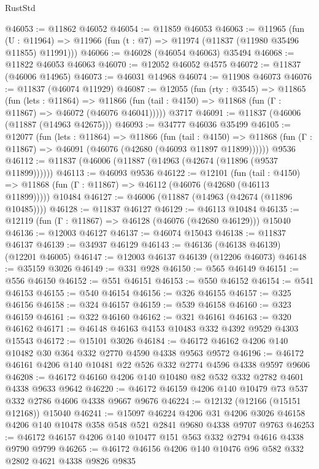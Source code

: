 \begin{lexlean}{RustStd}
\begin{coremodule}
{\begin{coremodule}
{{{{{{{{{{{{{{{{{{{{{{{{{{{{{{{{{{{{{{{{{{{{{{{{{{@46053 := @11862 @46052
@46054 := @11859 @46053
@46063 := @11965
    (fun (U : @11964) => @11966 (fun (t : @7) => @11974 (@11837 (@11980 @35496 @11855) @11991)))
@46066 := @46028 (@46054 @46063) @35494
@46068 := @11822 @46053 @46063
@46070 := @12052 @46052 @4575
@46072 := @11837 (@46006 @14965)
@46073 := @46031 @14968
@46074 := @11908 @46073
@46076 := @11837 (@46074 @11929)
@46087 := @12055
    (fun (rty : @3545) =>
    @11865
      (fun (lets : @11864) =>
      @11866 (fun (tail : @4150) => @11868 (fun (Γ : @11867) => @46072 (@46076 @46041)))))
    @3717
@46091 := @11837 (@46006 (@11887 (@14963 @42675)))
@46093 := @34777 @46036 @35499
@46105 := @12077
    (fun (lets : @11864) =>
    @11866
      (fun (tail : @4150) =>
      @11868 (fun (Γ : @11867) => @46091 (@46076 (@42680 (@46093 @11897 @11899))))))
    @9536
@46112 := @11837 (@46006 (@11887 (@14963 (@42674 (@11896 (@9537 @11899))))))
@46113 := @46093 @9536
@46122 := @12101
    (fun (tail : @4150) => @11868 (fun (Γ : @11867) => @46112 (@46076 (@42680 (@46113 @11899)))))
    @10484
@46127 := @46006 (@11887 (@14963 (@42674 (@11896 @10485))))
@46128 := @11837 @46127
@46129 := @46113 @10484
@46135 := @12119 (fun (Γ : @11867) => @46128 (@46076 (@42680 @46129))) @15040
@46136 := @12003 @46127
@46137 := @46074 @15043
@46138 := @11837 @46137
@46139 := @34937 @46129
@46143 := @46136 (@46138 @46139) (@12201 @46005)
@46147 := @12003 @46137 @46139 (@12206 @46073)
@46148 := @35159 @3026
@46149 := @331 @928
@46150 := @565 @46149
@46151 := @556 @46150
@46152 := @551 @46151
@46153 := @550 @46152
@46154 := @541 @46153
@46155 := @540 @46154
@46156 := @326 @46155
@46157 := @325 @46156
@46158 := @324 @46157
@46159 := @539 @46158
@46160 := @323 @46159
@46161 := @322 @46160
@46162 := @321 @46161
@46163 := @320 @46162
@46171 := @46148 @46163 @4153 @10483 @332 @4392 @9529 @4303 @15543
@46172 := @15101 @3026
@46184 := @46172 @46162 @4206 @140 @10482 @30 @364 @332 @2770 @4590 @4338 @9563 @9572
@46196 := @46172 @46161 @4206 @140 @10481 @22 @526 @332 @2774 @4596 @4338 @9597 @9606
@46208 := @46172 @46160 @4206 @140 @10480 @82 @532 @332 @2782 @4601 @4338 @9633 @9642
@46220 := @46172 @46159 @4206 @140 @10479 @73 @537 @332 @2786 @4606 @4338 @9667 @9676
@46224 := @12132 (@12166 (@15151 @12168)) @15040
@46241 := @15097
    @46224
    @4206
    @31
    @4206
    @3026
    @46158
    @4206
    @140
    @10478
    @358
    @548
    @521
    @2841
    @9680
    @4338
    @9707
    @9763
@46253 := @46172 @46157 @4206 @140 @10477 @151 @563 @332 @2794 @4616 @4338 @9790 @9799
@46265 := @46172 @46156 @4206 @140 @10476 @96 @582 @332 @2802 @4621 @4338 @9826 @9835
}}}}}}}}}}}}}}}}}}}}}}}}}}}}}}}}}}}}}}}}}}}}}}}}}}
\end{coremodule}}
\end{coremodule}
\end{lexlean}
